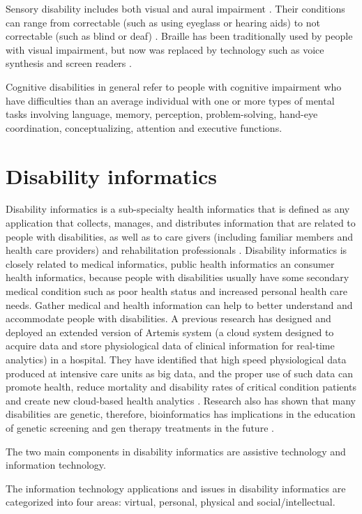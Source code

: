 \documentclass[sigconf]{acmart}
\begin{document}
Sensory disability includes both visual and aural impairment \cite{Appleyard2005}. Their conditions can range from correctable (such as using eyeglass or hearing aids) to not correctable (such as blind or deaf) \cite{Riga13}. Braille has been traditionally used by people with visual impairment, but now was replaced by technology such as voice synthesis and screen readers \cite{Riga13}.

Cognitive disabilities in general refer to people with cognitive impairment who have difficulties than an average individual with one or more types of mental tasks involving language, memory, perception, problem-solving, hand-eye coordination, conceptualizing, attention and executive functions\cite{Appleyard2005}. 

\section{Disability informatics}
Disability informatics is a sub-specialty health informatics that is defined as any application that collects, manages, and distributes information that are related to people with disabilities, as well as to care givers (including familiar members and health care providers) and rehabilitation professionals \cite{Appleyard2005}. Disability informatics is closely related to medical informatics, public health informatics an consumer health informatics, because people with disabilities usually have some secondary medical condition such as poor health status and increased personal health care needs. Gather medical and health information can help to better understand and accommodate people with disabilities. A previous research has designed and deployed an extended version of Artemis system (a cloud system designed to acquire data and store physiological data of clinical information for real-time analytics) in a hospital. They have identified that high speed physiological data produced at intensive care units as big data, and the proper use of such data can promote health, reduce mortality and disability rates of critical condition patients and create new cloud-based health analytics \cite{Khazaei14}.
Research also has shown that many disabilities are genetic, therefore, bioinformatics has implications in the education of genetic screening and gen therapy treatments in the future \cite{Appleyard2005}.

The two main components in disability informatics are assistive technology and information technology. 

The information technology applications and issues in disability informatics are categorized into four areas: virtual, personal, physical and social/intellectual.
\end{document}
